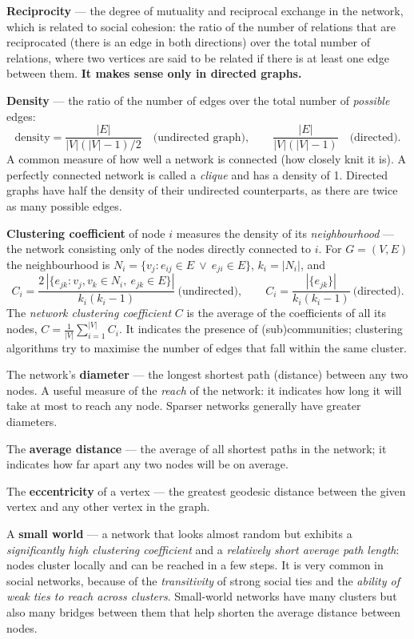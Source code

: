 \documentclass[11pt,a4paper]{article}
\theoremstyle{definition}
\begin{document}
\begin{defbox}
\textbf{Reciprocity} --- the degree of mutuality and reciprocal exchange in the network, which is
related to social cohesion: the ratio of the number of relations that are reciprocated (there is an
edge in both directions) over the total number of relations, where two vertices are said to be
related if there is at least one edge between them. \textbf{It makes sense only in directed graphs.}

\textbf{Density} --- the ratio of the number of edges over the total number of \emph{possible} edges:
\[ \text{density}=\frac{|E|}{|V|(|V|-1)/2}\quad\text{(undirected graph)},\qquad
   \frac{|E|}{|V|(|V|-1)}\quad\text{(directed)}. \]
A common measure of how well a network is connected (how closely knit it is). A perfectly connected
network is called a \emph{clique} and has a density of 1. Directed graphs have half the density of
their undirected counterparts, as there are twice as many possible edges.

\textbf{Clustering coefficient} of node $i$ measures the density of its \emph{neighbourhood} --- the
network consisting only of the nodes directly connected to $i$. For $G=(V,E)$ the neighbourhood is
$N_i=\{v_j: e_{ij}\in E\ \vee\ e_{ji}\in E\}$, $k_i=|N_i|$, and
\[ C_i=\frac{2\,|\{e_{jk}: v_j,v_k\in N_i,\ e_{jk}\in E\}|}{k_i(k_i-1)}
   \ \text{(undirected)},\qquad
   C_i=\frac{|\{e_{jk}\}|}{k_i(k_i-1)}\ \text{(directed)}. \]
The \emph{network clustering coefficient} $C$ is the average of the coefficients of all its nodes,
$C=\frac{1}{|V|}\sum_{i=1}^{|V|}C_i$. It indicates the presence of (sub)communities; clustering
algorithms try to maximise the number of edges that fall within the same cluster.
\end{defbox}

\begin{defbox}
The network's \textbf{diameter} --- the longest shortest path (distance) between any two nodes. A
useful measure of the \emph{reach} of the network: it indicates how long it will take at most to
reach any node. Sparser networks generally have greater diameters.

The \textbf{average distance} --- the average of all shortest paths in the network; it indicates how
far apart any two nodes will be on average.

The \textbf{eccentricity} of a vertex --- the greatest geodesic distance between the given vertex and
any other vertex in the graph.

A \textbf{small world} --- a network that looks almost random but exhibits a \emph{significantly high
clustering coefficient} and a \emph{relatively short average path length}: nodes cluster locally and
can be reached in a few steps. It is very common in social networks, because of the
\emph{transitivity} of strong social ties and the \emph{ability of weak ties to reach across
clusters}. Small-world networks have many clusters but also many bridges between them that help
shorten the average distance between nodes.
\end{defbox}
\end{document}

